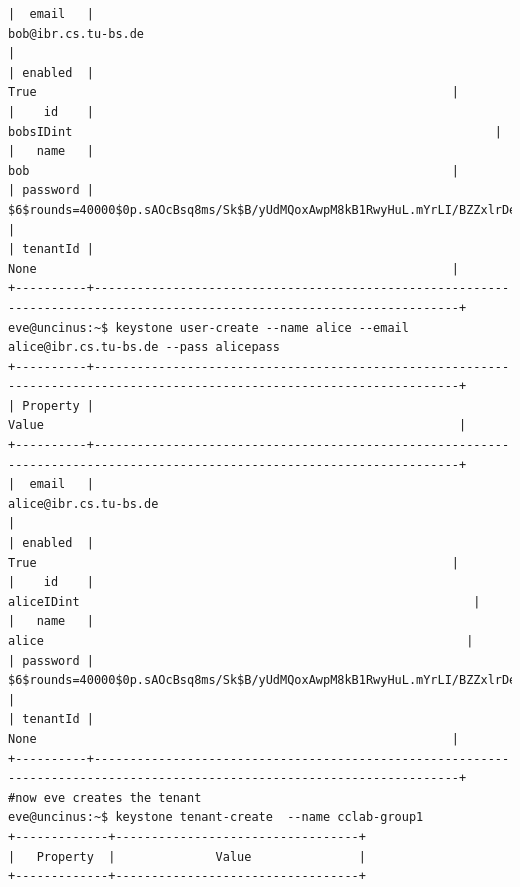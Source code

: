 \documentclass[a4paper,bibtotoc,english,liststotoc]{scrartcl}
\begin{document}
\begin{verbatim}
|  email   |                                                   bob@ibr.cs.tu-bs.de                                                   |
| enabled  |                                                           True                                                          |
|    id    |                                                        bobsIDint                                                           |
|   name   |                                                           bob                                                           |
| password | $6$rounds=40000$0p.sAOcBsq8ms/Sk$B/yUdMQoxAwpM8kB1RwyHuL.mYrLI/BZZxlrDeT1U.Rm6QfmBn5/MA86KcBHz90Hr67bOV8EGdfUbOkJ0JwBW. |
| tenantId |                                                           None                                                          |
+----------+-------------------------------------------------------------------------------------------------------------------------+
eve@uncinus:~$ keystone user-create --name alice --email alice@ibr.cs.tu-bs.de --pass alicepass
+----------+-------------------------------------------------------------------------------------------------------------------------+
| Property |                                                          Value                                                          |
+----------+-------------------------------------------------------------------------------------------------------------------------+
|  email   |                                                 alice@ibr.cs.tu-bs.de                                                   |
| enabled  |                                                           True                                                          |
|    id    |                                                        aliceIDint                                                       |
|   name   |                                                         alice                                                           |
| password | $6$rounds=40000$0p.sAOcBsq8ms/Sk$B/yUdMQoxAwpM8kB1RwyHuL.mYrLI/BZZxlrDeT1U.Rm6QfmBn5/MA86KcBHz90Hr67bOV8EGdfUbOkJ0JwBW. |
| tenantId |                                                           None                                                          |
+----------+-------------------------------------------------------------------------------------------------------------------------+
#now eve creates the tenant
eve@uncinus:~$ keystone tenant-create  --name cclab-group1
+-------------+----------------------------------+
|   Property  |              Value               |
+-------------+----------------------------------+

\end{verbatim}
\end{document}
